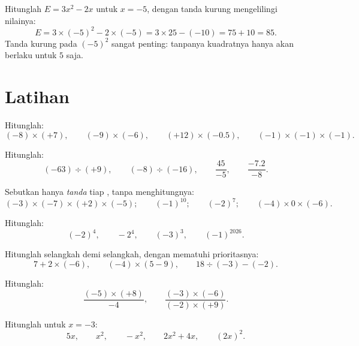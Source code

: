\begin{example}\label{ex:g8:negprod:substitute}
Hitunglah $E = 3x^2 - 2x$ untuk $x = -5$, dengan tanda kurung mengelilingi nilainya:
\[
E = 3 \times (-5)^2 - 2 \times (-5)
= 3 \times 25 - (-10)
= 75 + 10 = 85 .
\]
Tanda kurung pada $(-5)^2$ sangat penting: tanpanya kuadratnya hanya
akan berlaku untuk $5$ saja.
\end{example}

\section{Latihan}

\begin{exercise}[$\star$]\label{exo:g8:negprod:1}
Hitunglah:
\[
(-8) \times (+7), \qquad
(-9) \times (-6), \qquad
(+12) \times (-0.5), \qquad
(-1) \times (-1) \times (-1).
\]
\end{exercise}

\begin{exercise}[$\star$]\label{exo:g8:negprod:2}
Hitunglah:
\[
(-63) \div (+9), \qquad
(-8) \div (-16), \qquad
\frac{45}{-5}, \qquad
\frac{-7.2}{-8} .
\]
\end{exercise}

\begin{exercise}[$\star$]\label{exo:g8:negprod:3}
Sebutkan hanya \emph{tanda} tiap , tanpa menghitungnya:
\[
(-3) \times (-7) \times (+2) \times (-5); \qquad
(-1)^{10}; \qquad
(-2)^{7}; \qquad
(-4) \times 0 \times (-6).
\]
\end{exercise}

\begin{exercise}[$\star$]\label{exo:g8:negprod:4}
Hitunglah:
\[
(-2)^4, \qquad
-2^4, \qquad
(-3)^3, \qquad
(-1)^{2026} .
\]
\end{exercise}

\begin{exercise}[$\star$]\label{exo:g8:negprod:5}
Hitunglah selangkah demi selangkah, dengan mematuhi prioritasnya:
\[
7 + 2 \times (-6), \qquad
(-4) \times (5 - 9), \qquad
18 \div (-3) - (-2) .
\]
\end{exercise}

\begin{exercise}[$\star$]\label{exo:g8:negprod:6}
Hitunglah:
\[
\frac{(-5) \times (+8)}{-4}, \qquad
\frac{(-3) \times (-6)}{(-2) \times (+9)} .
\]
\end{exercise}

\begin{exercise}[$\star$]\label{exo:g8:negprod:7}
Hitunglah untuk $x = -3$:
\[
5x, \qquad x^2, \qquad -x^2, \qquad 2x^2 + 4x, \qquad (2x)^2 .
\]
\end{exercise}

